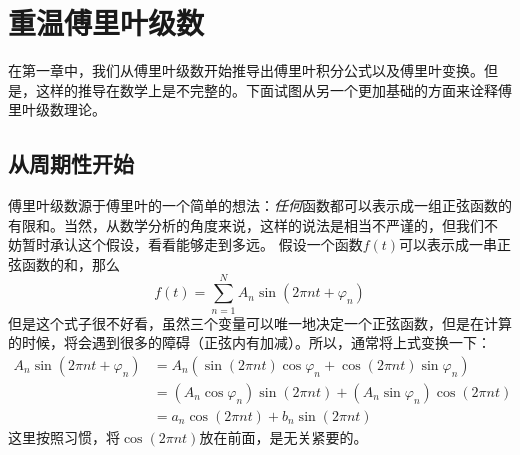 \chapter{重温傅里叶级数}
    在第一章中，我们从傅里叶级数开始推导出傅里叶积分公式以及傅里叶变换。但是，这样的推导在数学上是不完整的。下面试图从另一个更加基础的方面来诠释傅里叶级数理论。
    \section{从周期性开始}
        傅里叶级数源于傅里叶的一个简单的想法：\emph{任何}函数都可以表示成一组正弦函数的有限和。当然，从数学分析的角度来说，这样的说法是相当不严谨的，但我们不%
        妨暂时承认这个假设，看看能够走到多远。
        假设一个函数$f(t)$可以表示成一串正弦函数的和，那么
        \begin{equation*}
            f(t) = \sum_{n = 1}^{N} A_n\sin(2\pi n t + \varphi_n)
        \end{equation*}
        但是这个式子很不好看，虽然三个变量可以唯一地决定一个正弦函数，但是在计算的时候，将会遇到很多的障碍（正弦内有加减）。所以，通常将上式变换一下：
        \begin{equation}
            \begin{split}
                A_n\sin(2\pi n t + \varphi_n) &= A_n(\sin(2\pi nt)\cos\varphi_n + \cos(2\pi nt)\sin\varphi_n)\\
                &= (A_n\cos\varphi_n)\sin(2\pi nt) + (A_n\sin\varphi_n)\cos(2\pi nt)\\
                &= a_n\cos(2\pi nt) + b_n\sin(2\pi nt)
            \end{split}
            \label{eq: 3.1}
        \end{equation}
        这里按照习惯，将$\cos(2\pi nt)$放在前面，是无关紧要的。

